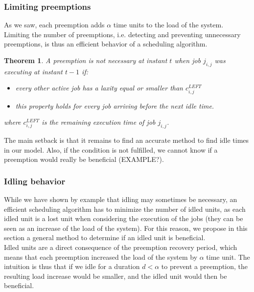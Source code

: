 \documentclass[a4paper,10pt]{article}
\newtheorem{theorem}{Theorem}
\begin{document}
    \subsubsection{Limiting preemptions}
    \label{sct:limPreemp}

        As we saw, each preemption adds $\alpha$ time units to the load of the system. Limiting the number of preemptions, i.e. detecting and preventing unnecessary preemptions, is thus an efficient behavior of a scheduling algorithm.\\

        \begin{theorem}
            \label{the:limPreemp}
            A preemption is not necessary at instant $t$ when job $j_{i,j}$ was executing at instant $t-1$ if:
            \begin{itemize}
                \item every other active job has a laxity equal or smaller than $c_{i,j}^{LEFT}$
                \item this property holds for every job arriving before the next idle time.
            \end{itemize}
            where $c_{i,j}^{LEFT}$ is the remaining execution time of job $j_{i,j}$.
        \end{theorem}

        The main setback is that it remains to find an accurate method to find idle times in our model. Also, if the condition is not fulfilled, we cannot know if a preemption would really be beneficial (EXAMPLE?).

    \subsubsection{Idling behavior}
    \label{sct:idlBehav}

        While we have shown by example that idling may sometimes be necessary, an efficient scheduling algorithm has to minimize the number of idled units, as each idled unit is a lost unit when considering the execution of the jobs (they can be seen as an increase of the load of the system). For this reason, we propose in this section a general method to determine if an idled unit is beneficial.\\

        Idled units are a direct consequence of the preemption recovery period, which means that each preemption increased the load of the system by $\alpha$ time unit. The intuition is thus that if we idle for a duration $d < \alpha$ to prevent a preemption, the resulting load increase would be smaller, and the idled unit would then be beneficial.\\
\end{document}
